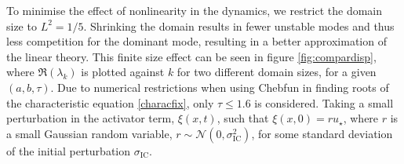 To minimise the effect of nonlinearity in the dynamics, we restrict the domain size to $L^2=1/5$. Shrinking the domain results in fewer unstable modes and thus less competition for the dominant mode, resulting in a better approximation of the linear theory. This finite size effect can be seen in figure \ref{fig:compardisp}, where $\Re(\lambda_k)$ is plotted against $k$ for two different domain sizes, for a given $(a,b,\tau)$. Due to numerical restrictions when using Chebfun in finding roots of the characteristic equation \eqref{characfix}, only $\tau\leq1.6$ is considered. Taking a small perturbation in the activator term, $\xi(x,t)$, such that $\xi(x,0)=ru_\star$, where $r$ is a small Gaussian random variable, $r\sim\mathcal{N}\left(0,\sigma_{\text{IC}}^2\right)$,
for some standard deviation of the initial perturbation $\sigma_{\text{IC}}$.

